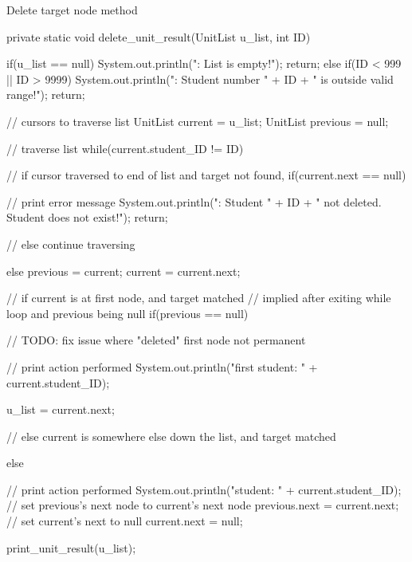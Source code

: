 \begin{listing}[H]
\caption{Delete target node method}
\begin{javacode}
private static void delete_unit_result(UnitList u_list, int ID) {

    if(u_list == null) {
        System.out.println("\nError: List is empty!");
        return;
    } else if(ID < 999 || ID > 9999) {
        System.out.println("\nError: Student number " 
                + ID + " is outside valid range!");
        return;
    }

    // cursors to traverse list
    UnitList current = u_list;
    UnitList previous = null;

    // traverse list
    while(current.student_ID != ID) {

        // if cursor traversed to end of list and target not found,
        if(current.next == null) {

            // print error message
            System.out.println("\nError: Student " 
                    + ID + " not deleted. Student does not exist!");
            return;

        // else continue traversing
        } else {
            previous = current;
            current = current.next;
        }
    }

    // if current is at first node, and target matched
    // implied after exiting while loop and previous being null
    if(previous == null) {

        // TODO: fix issue where "deleted" first node not permanent

        // print action performed
        System.out.println("\nDeleted first student: " + current.student_ID);

        u_list = current.next;

    // else current is somewhere else down the list, and target matched
    } else {

        // print action performed
        System.out.println("\nDeleted student: " + current.student_ID);
        // set previous's next node to current's next node
        previous.next = current.next;
        // set current's next to null
        current.next = null;
    }

    print_unit_result(u_list);
}
\end{javacode}
\end{listing}